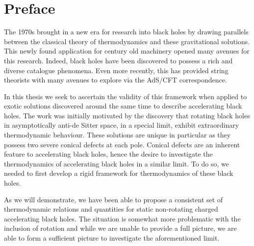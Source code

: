 \documentclass[
twoside,
openright,
frontopenright,
]{dmathesis}
\begin{document}
\disableprotrusion
\tableofcontents*
\listoftodos
\enableprotrusion

\cleardoublepage
{}



\chapter*{Preface}

The 1970s brought in a new era for research into black holes by drawing
parallels between the classical theory of thermodynamics and these gravitational
solutions. This newly found application for century old machinery opened many
avenues for this research. Indeed, black holes have been discovered to possess a
rich and diverse catalogue phenomena. Even more recently, this has provided
string theorists with many avenues to explore via the AdS/CFT correspondence.

In this thesis we seek to ascertain the validity of this framework when applied
to exotic solutions discovered around the same time to describe accelerating
black holes. The work was initially motivated by the discovery that rotating
black holes in asymptotically anti-de Sitter space, in a special limit, exhibit
extraordinary thermodynamic behaviour. These solutions are unique in particular
as they possess two severe conical defects at each pole. Conical defects are an
inherent feature to accelerating black holes, hence the desire to investigate
the thermodynamics of accelerating black holes in a similar limit. To do so, we
needed to first develop a rigid framework for thermodynamics of these black
holes.

As we will demonstrate, we have been able to propose a consistent set of
thermodynamic relations and quantities for static non-rotating charged accelerating
black holes. The situation is somewhat more problematic with the inclusion of
rotation and while we are unable to provide a full picture, we are able to form
a sufficient picture to investigate the aforementioned limit.
\end{document}
